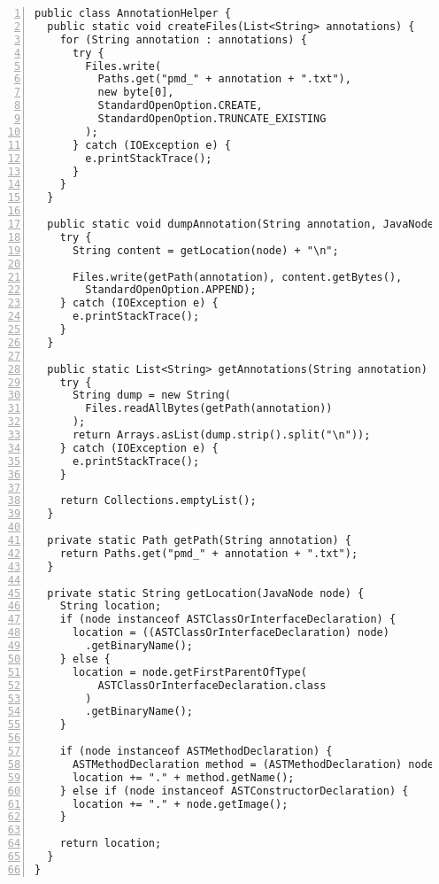 \begin{lstlisting}[caption={AnnotationHelper, a class that is used to store annotations to, and fetch annotations from, a text file. A separate file is created for each annotation, and each line in this file describes the canonical name of a class or method that is marked with the annotation. This functionality is required to implement case 2 of constraint 4, i.e. looking up the annotations of a remote method or class.}, captionpos=b, label=lst:pmd_annotation_helper, numbers=left, showstringspaces=false]
public class AnnotationHelper {
  public static void createFiles(List<String> annotations) {
    for (String annotation : annotations) {
      try {
        Files.write(
          Paths.get("pmd_" + annotation + ".txt"),
          new byte[0],
          StandardOpenOption.CREATE,
          StandardOpenOption.TRUNCATE_EXISTING
        );
      } catch (IOException e) {
        e.printStackTrace();
      }
    }
  }

  public static void dumpAnnotation(String annotation, JavaNode node) {
    try {
      String content = getLocation(node) + "\n";

      Files.write(getPath(annotation), content.getBytes(),
        StandardOpenOption.APPEND);
    } catch (IOException e) {
      e.printStackTrace();
    }
  }

  public static List<String> getAnnotations(String annotation) {
    try {
      String dump = new String(
        Files.readAllBytes(getPath(annotation))
      );
      return Arrays.asList(dump.strip().split("\n"));
    } catch (IOException e) {
      e.printStackTrace();
    }

    return Collections.emptyList();
  }

  private static Path getPath(String annotation) {
    return Paths.get("pmd_" + annotation + ".txt");
  }

  private static String getLocation(JavaNode node) {
    String location;
    if (node instanceof ASTClassOrInterfaceDeclaration) {
      location = ((ASTClassOrInterfaceDeclaration) node)
        .getBinaryName();
    } else {
      location = node.getFirstParentOfType(
          ASTClassOrInterfaceDeclaration.class
        )
        .getBinaryName();
    }

    if (node instanceof ASTMethodDeclaration) {
      ASTMethodDeclaration method = (ASTMethodDeclaration) node;
      location += "." + method.getName();
    } else if (node instanceof ASTConstructorDeclaration) {
      location += "." + node.getImage();
    }

    return location;
  }
}
\end{lstlisting}

